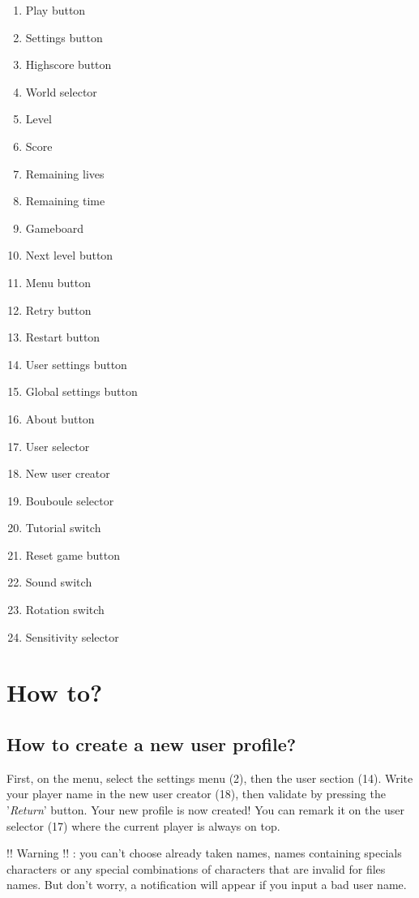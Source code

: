 \documentclass[a4paper,10pt]{report}
\begin{document}
\begin{multicols}{3}
\begin{enumerate}
\item Play button
\item Settings button
\item Highscore button
\item World selector
\item Level
\item Score
\item Remaining lives
\item Remaining time
\item Gameboard
\item Next level button
\item Menu button
\item Retry button
\item Restart button
\item User settings button
\item Global settings button
\item About button
\item User selector
\item New user creator
\item Bouboule selector
\item Tutorial switch
\item Reset game button
\item Sound switch
\item Rotation switch
\item Sensitivity selector
\end{enumerate}
\end{multicols}


\section*{How to?}

	\subsection*{How to create a new user profile?}
First, on the menu, select the settings menu (2), then the user section (14). Write your player name in the new user creator (18), then validate by pressing the '\textit{Return}' button. Your new profile is now created! You can remark it on the user selector (17) where the current player is always on top.

!! Warning !! : you can't choose already taken names, names containing specials characters or any special combinations of characters that are invalid for files names. But don't worry, a notification will appear if you input a bad user name.
\end{document}
